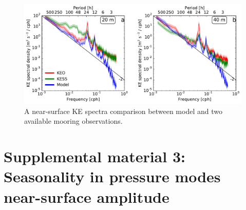 \documentclass[grl]{agutex2015}
\begin{document}
\begin{article}
\begin{figure}[ht]
   \begin{center}
     \includegraphics[width=.9\textwidth]{figs/figA1.pdf}
  \caption{A near-surface KE spectra comparison between model and two
  available mooring observations.}
  \label{figA1}
  \end{center}
\end{figure}

\section{Supplemental material 3: Seasonality in pressure modes near-surface amplitude}

%
%
%
%
%
%
%


\end{article}
\end{document}
